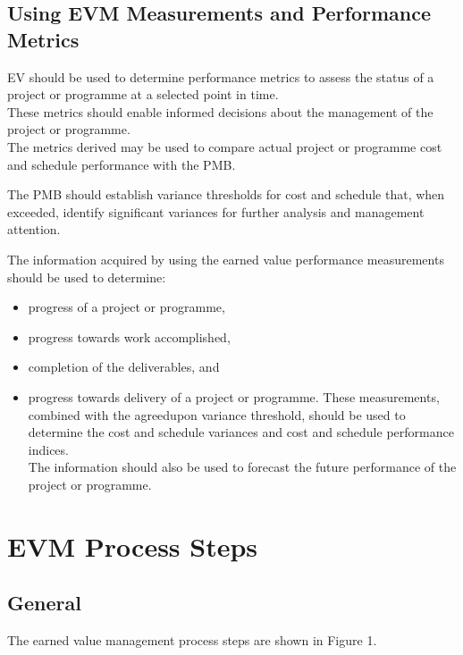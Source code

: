\documentclass[letterpaper,10pt,english]{jupyterBook}
\begin{document}
\subsection{Using EVM Measurements and Performance Metrics}
\label{\detokenize{PM/evm:using-evm-measurements-and-performance-metrics}}
\sphinxAtStartPar
EV should be used to determine performance metrics to assess the status of a project or programme at a selected point in time. \\
These metrics should enable informed decisions about the management of the project or programme. \\
The metrics derived may be used to compare actual project or programme cost and schedule performance with the PMB.

\sphinxAtStartPar
The PMB should establish variance thresholds for cost and schedule that, when exceeded, identify significant variances for further analysis and management attention.

\sphinxAtStartPar
The information acquired by using the earned value performance measurements should be used to determine:
\begin{itemize}
\item {} 
\sphinxAtStartPar
progress of a project or programme,

\item {} 
\sphinxAtStartPar
progress towards work accomplished,

\item {} 
\sphinxAtStartPar
completion of the deliverables, and

\item {} 
\sphinxAtStartPar
progress towards delivery of a project or programme.
These measurements, combined with the agreed\sphinxhyphen{}upon variance threshold, should be used to determine the cost and schedule variances and cost and schedule performance indices. \\
The information should also be used to forecast the future performance of the project or programme.

\end{itemize}


\section{EVM Process Steps}
\label{\detokenize{PM/evm:evm-process-steps}}

\subsection{General}
\label{\detokenize{PM/evm:general}}
\sphinxAtStartPar
The earned value management process steps are shown in Figure 1.
\end{document}
